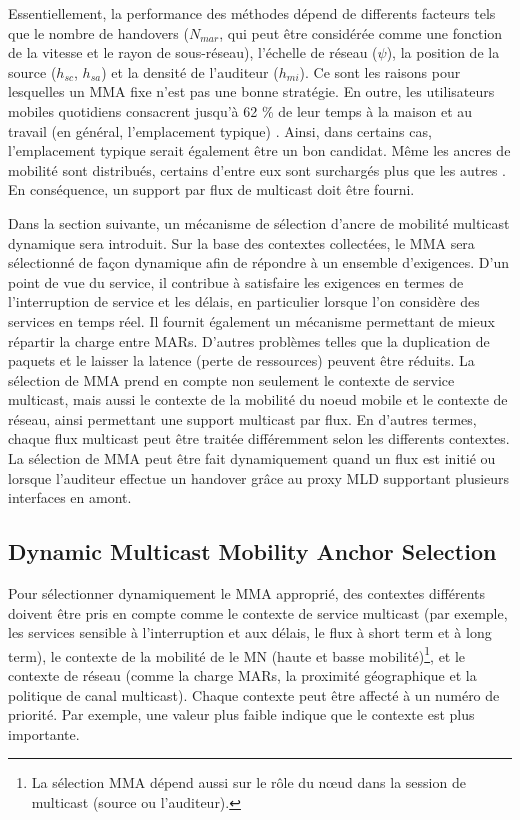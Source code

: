 Essentiellement, la performance des méthodes dépend de differents facteurs tels que le nombre de handovers ($ N_{mar} $, qui peut être considérée comme une fonction de la vitesse et le rayon de sous-réseau), l'échelle de réseau ($ \psi $), la position de la source ($h_{sc} $, $ h_{sa} $) et la densité de l'auditeur ($ h_{mi} $). Ce sont les raisons pour lesquelles un MMA fixe n'est pas une bonne stratégie. En outre, les utilisateurs mobiles quotidiens consacrent jusqu'à 62 \% de leur temps à la maison et au travail (en général, l'emplacement typique) \cite{cisco_connected_lives}. Ainsi, dans certains cas, l'emplacement typique serait également être un bon candidat. Même les ancres de mobilité sont distribués, certains d'entre eux sont surchargés plus que les autres \cite{anchor_selection}. En conséquence, un support par flux de multicast doit être fourni.


Dans la section suivante, un mécanisme de sélection d'ancre de mobilité multicast dynamique sera introduit. Sur la base des contextes collectées, le MMA sera sélectionné de façon dynamique afin de répondre à un ensemble d'exigences. D'un point de vue du service, il contribue à satisfaire les exigences en termes de l'interruption de service et les délais, en particulier lorsque l'on considère des services en temps réel. Il fournit également un mécanisme permettant de mieux répartir la charge entre MARs. D'autres problèmes telles que la duplication de paquets et le laisser la latence (perte de ressources) peuvent être réduits. La sélection de MMA prend en compte non seulement le contexte de service multicast, mais aussi le contexte de la mobilité du noeud mobile et le contexte de réseau, ainsi permettant une support multicast par flux. En d'autres termes, chaque flux multicast peut être traitée différemment selon ​​les differents contextes. La sélection de MMA peut être fait dynamiquement quand un flux est initié ou lorsque l'auditeur effectue un handover grâce au proxy MLD supportant plusieurs interfaces en amont.


\subsection{Dynamic Multicast Mobility Anchor Selection} \label{c10:dmma}
Pour sélectionner dynamiquement le MMA approprié, des contextes différents doivent être pris en compte comme le contexte de service multicast (par exemple, les services sensible à l'interruption et  aux délais, le flux à short term et à long term), le contexte de la mobilité de le MN (haute et basse mobilité)\footnote{La sélection MMA dépend aussi sur le rôle du nœud dans la session de multicast (source ou l'auditeur).}, et le contexte de réseau (comme la charge MARs, la proximité géographique et la politique de canal multicast). Chaque contexte peut être affecté à un numéro de priorité. Par exemple, une valeur plus faible indique que le contexte est plus importante.

